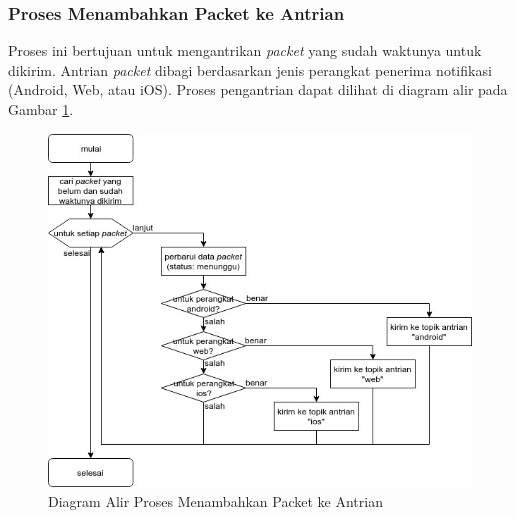 \subsubsection{Proses Menambahkan Packet ke Antrian}
\label{3:proses_menambahkan_packet_ke_antrian}
\par Proses ini bertujuan untuk mengantrikan \textit{packet} yang sudah waktunya untuk dikirim.
Antrian \textit{packet} dibagi berdasarkan jenis perangkat penerima notifikasi (Android, Web, atau iOS). Proses pengantrian dapat dilihat di diagram alir pada Gambar \ref{flowchart_menambahkan_packet_ke_antrian}.
\begin{figure}[hb]
    \centering\includegraphics[width=1\textwidth]{bab3/flowchart/flowchart-menambahkan_packet_ke_antrian.jpg}
    \caption{Diagram Alir Proses Menambahkan Packet ke Antrian} \label{flowchart_menambahkan_packet_ke_antrian}
\end{figure}

